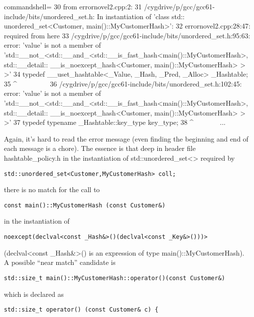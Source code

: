 \begin{tcblisting}{commandshell={}}
30 from errornovel2.cpp:2:
31 /cygdrive/p/gcc/gcc61-include/bits/unordered_set.h: In instantiation of ’class std::
unordered_set<Customer, main()::MyCustomerHash>’:
32 errornovel2.cpp:28:47: required from here
33 /cygdrive/p/gcc/gcc61-include/bits/unordered_set.h:95:63: error: ’value’ is not a member
of ’std::__not_<std::__and_<std::__is_fast_hash<main()::MyCustomerHash>, std::__detail::
__is_noexcept_hash<Customer, main()::MyCustomerHash> > >’
34 typedef __uset_hashtable<_Value, _Hash, _Pred, _Alloc> _Hashtable;
35 ^~~~~~~~~~
36 /cygdrive/p/gcc/gcc61-include/bits/unordered_set.h:102:45: error: ’value’ is not a member
of ’std::__not_<std::__and_<std::__is_fast_hash<main()::MyCustomerHash>, std::__detail::
__is_noexcept_hash<Customer, main()::MyCustomerHash> > >’
37 typedef typename _Hashtable::key_type key_type;
38 ^~~~~~~~
...
\end{tcblisting}

Again, it’s hard to read the error message (even finding the beginning and end of each message is a chore). The essence is that deep in header file hashtable\_policy.h in the instantiation of std::unordered\_set<> required by

\begin{lstlisting}[style=styleCXX]
std::unordered_set<Customer,MyCustomerHash> coll;
\end{lstlisting}

there is no match for the call to

\begin{lstlisting}[style=styleCXX]
const main()::MyCustomerHash (const Customer&)
\end{lstlisting}

in the instantiation of

\begin{lstlisting}[style=styleCXX]
noexcept(declval<const _Hash&>()(declval<const _Key&>()))>
\end{lstlisting}

(declval<const \_Hash\&>() is an expression of type main()::MyCustomerHash). A possible “near match” candidate is

\begin{lstlisting}[style=styleCXX]
std::size_t main()::MyCustomerHash::operator()(const Customer&)
\end{lstlisting}

which is declared as

\begin{lstlisting}[style=styleCXX]
std::size_t operator() (const Customer& c) {
\end{lstlisting}

